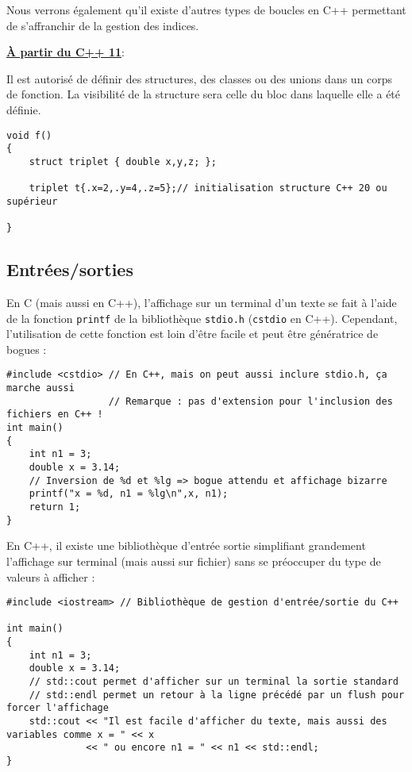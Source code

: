 Nous verrons également qu'il existe d'autres types de boucles en C++ permettant de s'affranchir de la gestion des indices.

\underline{\textbf{À partir du C++ 11}}:

Il est autorisé de définir des structures, des classes ou des unions dans un corps de fonction. La visibilité de la structure sera celle du bloc dans laquelle elle a été définie.

\begin{lstlisting}[caption=déclaration d'une structure au sein d'une fonction (C++ 11 ou supérieur)]
void f()
{
    struct triplet { double x,y,z; };

    triplet t{.x=2,.y=4,.z=5};// initialisation structure C++ 20 ou supérieur

}
\end{lstlisting}

\subsection{Entrées/sorties}

En C (mais aussi en C++), l'affichage sur un terminal d'un texte se fait à l'aide de la fonction \texttt{printf}
de la bibliothèque \texttt{stdio.h} (\texttt{cstdio} en C++). Cependant, l'utilisation de cette fonction est loin d'être facile
et peut être génératrice de bogues :

\begin{lstlisting}
#include <cstdio> // En C++, mais on peut aussi inclure stdio.h, ça marche aussi
                  // Remarque : pas d'extension pour l'inclusion des fichiers en C++ !
int main()
{
    int n1 = 3;
    double x = 3.14;
    // Inversion de %d et %lg => bogue attendu et affichage bizarre
    printf("x = %d, n1 = %lg\n",x, n1);
    return 1;
}
\end{lstlisting}

En C++, il existe une bibliothèque d'entrée sortie simplifiant grandement l'affichage sur terminal (mais aussi sur fichier) sans se préoccuper du type de valeurs à afficher :

\begin{lstlisting}
#include <iostream> // Bibliothèque de gestion d'entrée/sortie du C++

int main()
{
    int n1 = 3;
    double x = 3.14;
    // std::cout permet d'afficher sur un terminal la sortie standard
    // std::endl permet un retour à la ligne précédé par un flush pour forcer l'affichage
    std::cout << "Il est facile d'afficher du texte, mais aussi des variables comme x = " << x
              << " ou encore n1 = " << n1 << std::endl;
}
\end{lstlisting}

